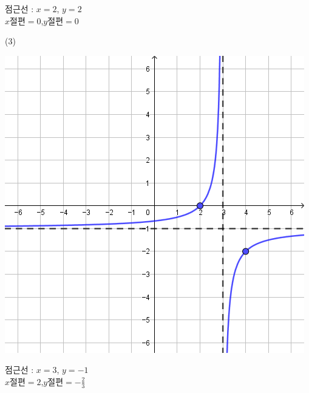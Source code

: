 \documentclass{oblivoir}
\begin{document}
\begin{multicols*}{2}
\begin{center}
\end{center}
\parbox[t]{0.9\columnwidth}{점근선 : \(x=2\), \(y=2\)\\\(x절편=0\),\qquad\(y절편=0\)}
\par\columnbreak\noindent
(3)
\begin{center}
\includegraphics[width=0.8\columnwidth]{rational_9-3}
\end{center}
\parbox[t]{0.9\columnwidth}{점근선 : \(x=3\), \(y=-1\)\\\(x절편=2\),\qquad\(y절편=-\frac23\)}


\end{multicols*}
\end{document}
